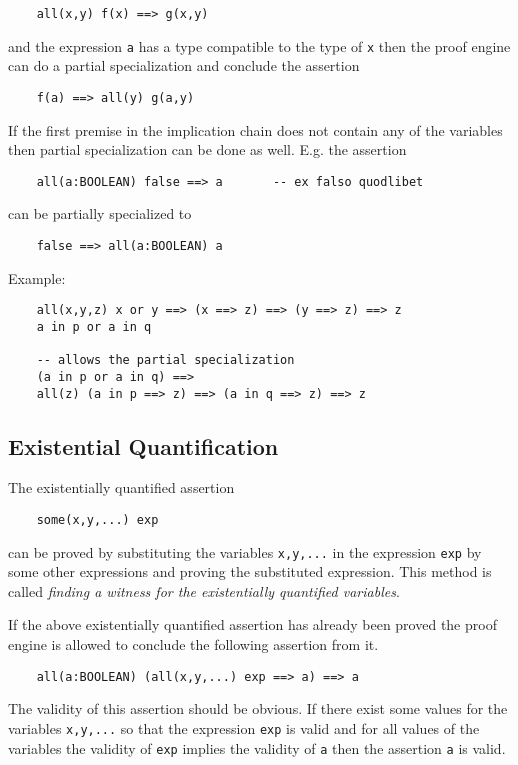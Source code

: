 \begin{lstlisting}
    all(x,y) f(x) ==> g(x,y)
\end{lstlisting}
and the expression \lstinline!a! has a type compatible to the type of
\lstinline!x! then the proof engine can do a partial specialization and
conclude the assertion

\begin{lstlisting}
    f(a) ==> all(y) g(a,y)
\end{lstlisting}

If the first premise in the implication chain does not contain any of the
variables then partial specialization can be done as well. E.g. the assertion
\begin{lstlisting}
    all(a:BOOLEAN) false ==> a       -- ex falso quodlibet
\end{lstlisting}
can be partially specialized to
\begin{lstlisting}
    false ==> all(a:BOOLEAN) a
\end{lstlisting}


\noindent Example:
\begin{lstlisting}
    all(x,y,z) x or y ==> (x ==> z) ==> (y ==> z) ==> z
    a in p or a in q

    -- allows the partial specialization
    (a in p or a in q) ==>
    all(z) (a in p ==> z) ==> (a in q ==> z) ==> z
\end{lstlisting}


\subsection{Existential Quantification}

The existentially quantified assertion
%
\begin{lstlisting}
    some(x,y,...) exp
\end{lstlisting}
%
can be proved by substituting the variables \lstinline!x,y,...! in the
expression \lstinline!exp! by some other expressions and proving the
substituted expression. This method is called {\em finding a witness for the
existentially quantified variables}.

If the above existentially quantified assertion has already been proved the
proof engine is allowed to conclude the following assertion from it.
\begin{lstlisting}
    all(a:BOOLEAN) (all(x,y,...) exp ==> a) ==> a
\end{lstlisting}
The validity of this assertion should be obvious. If there exist some values
for the variables \lstinline!x,y,...! so that the expression \lstinline!exp!
is valid and for all values of the variables the validity of \lstinline!exp!
implies the validity of \lstinline!a! then the assertion \lstinline!a! is
valid.



